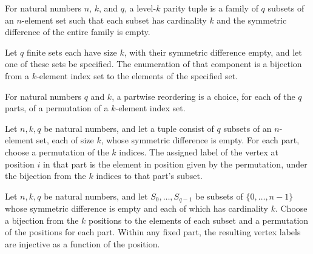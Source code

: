 \begin{definition}
\label{FABL.LevelKParityTuple}
\leanok
{}
For natural numbers $n$, $k$, and $q$, a level-$k$ parity tuple is a family of $q$
subsets of an $n$-element set such that each subset has cardinality $k$ and the
symmetric difference of the entire family is empty.
\end{definition}

\begin{definition}
\label{FABL.LevelKParityTuple.enumeration}
\leanok
{}
Let $q$ finite sets each have size $k$, with their symmetric difference empty, and let
one of these sets be specified. The enumeration of that component is a bijection from a
$k$-element index set to the elements of the specified set.
\end{definition}

\begin{definition}
\label{FABL.ParityTupleReordering}
\leanok
For natural numbers $q$ and $k$, a partwise reordering is a choice, for each of the $q$
parts, of a permutation of a $k$-element index set.
\end{definition}

\begin{definition}
\label{FABL.LevelKParityTuple.assignedVertexLabel}
\leanok
{}
Let $n,k,q$ be natural numbers, and let a tuple consist of $q$ subsets of an $n$-element
set, each of size $k$, whose symmetric difference is empty. For each part, choose a
permutation of the $k$ indices. The assigned label of the vertex at position $i$ in that
part is the element in position given by the permutation, under the bijection from the
$k$ indices to that part’s subset.
\end{definition}

\begin{theorem}
\label{FABL.LevelKParityTuple.assignedVertexLabel_injective_on_part}
\leanok
{}
Let $n,k,q$ be natural numbers, and let $S_0,\ldots,S_{q-1}$ be subsets of
$\{0,\ldots,n-1\}$ whose symmetric difference is empty and each of which has cardinality
$k$. Choose a bijection from the $k$ positions to the elements of each subset and a
permutation of the positions for each part. Within any fixed part, the resulting vertex
labels are injective as a function of the position.
\end{theorem}

